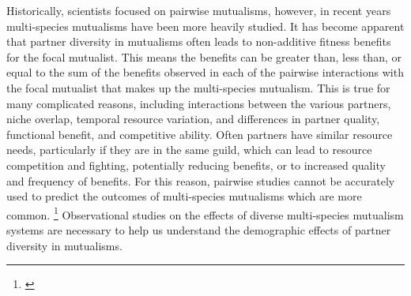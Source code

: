 \documentclass[12pt,a4paper]{article}
\newcommand{\ali}[2]{{\color{pink}{#1}}\footnote{\textit{\color{pink}{#2}}}}
\begin{document}
Historically, scientists focused on pairwise mutualisms\cite{Bascompote2019}, however, in recent years multi-species mutualisms have been more heavily studied. 
It has become apparent that partner diversity in mutualisms often leads to non-additive fitness benefits for the focal mutualist\cite{Afkhami2014, Palmer2010}. 
This means the benefits can be greater than, less than, or equal to the sum of the benefits observed in each of the pairwise interactions with the focal mutualist that makes up the multi-species mutualism. 
This is true for many complicated reasons, including interactions between the various partners, niche overlap, temporal resource variation, and differences in partner quality, functional benefit, and competitive ability\cite{stanton2013, Afkhami2014,Boucher1982}.
Often partners have similar resource needs, particularly if they are in the same guild, which can lead to resource competition and fighting, potentially reducing benefits, or to increased quality and frequency of benefits\cite{Bascompote2019,Stanton2003}.
For this reason, pairwise studies cannot be accurately used to predict the outcomes of multi-species mutualisms\cite{Palmer2010, Stanton2013. Chamberlain2014, Song2020} which are more common.
\ali{***** Biodiversity ecosystem function? }{After this I feel like I go straight into the mechanisms which explain the potential positive effects of diversity, but I don't specify that I am talking about those and I also don't talk about any explainations of negative effects? Maybe if I include the connection between BEF theory and mutualisms here it will make a nice bridge to the benefits of diversity?} 
Observational studies on the effects of diverse multi-species mutualism systems are necessary to help us understand the demographic effects of partner diversity in mutualisms. 
\end{document}
